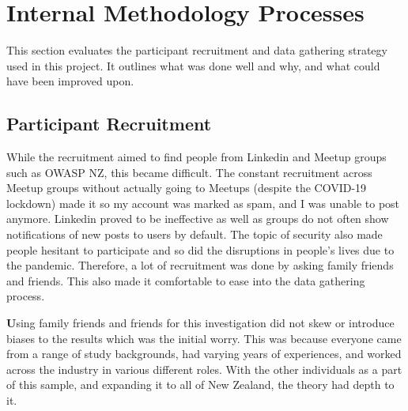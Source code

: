 \section{Internal Methodology Processes}

This section evaluates the participant recruitment and data gathering strategy used in this project. It outlines what was done well and why, and what could have been improved upon. 

\subsection{Participant Recruitment}

While the recruitment aimed to find people from Linkedin and Meetup groups such as OWASP NZ, this became difficult. The constant recruitment across Meetup groups without actually going to Meetups (despite the COVID-19 lockdown) made it so my account was marked as spam, and I was unable to post anymore. Linkedin proved to be ineffective as well as groups do not often show notifications of new posts to users by default. The topic of security also made people hesitant to participate and so did the disruptions in people's lives due to the pandemic. Therefore, a lot of recruitment was done by asking family friends and friends. This also made it comfortable to ease into the data gathering process.
\newline
\par\textbf
Using family friends and friends for this investigation did not skew or introduce biases to the results which was the initial worry. This was because everyone came from a range of study backgrounds, had varying years of experiences, and worked across the industry in various different roles. With the other individuals as a part of this sample, and expanding it to all of New Zealand, the theory had depth to it.


